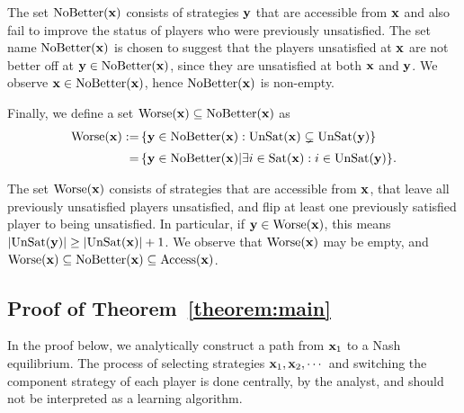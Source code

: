 The set ${\rm NoBetter}({\mathbf{x}})$ consists of strategies ${\mathbf{y}}$ that are accessible from ${\mathbf{x}}$ and also fail to improve the status of players who were previously unsatisfied. The set name ${\rm NoBetter}({\mathbf{x}})$ is chosen to suggest that the players unsatisfied at ${\mathbf{x}}$ are not better off at ${\mathbf{y}} \in {\rm NoBetter}({\mathbf{x}})$, since they are unsatisfied at both ${\mathbf{x}}$ and ${\mathbf{y}}$. We observe ${\mathbf{x}} \in {\rm NoBetter}({\mathbf{x}})$, hence ${\rm NoBetter}({\mathbf{x}})$ is non-empty. 

Finally, we define a set ${\rm Worse}({\mathbf{x}}) \subseteq {\rm NoBetter}({\mathbf{x}})$ as
\begin{align*}
{\rm Worse}({\mathbf{x}}) :=& \left\{ {\mathbf{y}} \in {\rm NoBetter}({\mathbf{x}}) : {\rm UnSat}({\mathbf{x}}) \subsetneq {\rm UnSat}({\mathbf{y}}) \right\}  \\[2.5pt]
            =&  \left\{ {\mathbf{y}} \in {\rm NoBetter}({\mathbf{x}}) \middle| \exists i \in {\rm Sat}({\mathbf{x}}) : i \in {\rm UnSat}({\mathbf{y}}) \right\} \hspace{-1.5pt}.            
\end{align*}

The set ${\rm Worse}({\mathbf{x}})$ consists of strategies that are accessible from ${\mathbf{x}}$, that leave all previously unsatisfied players unsatisfied, and flip at least one previously satisfied player to being unsatisfied. In particular, if ${\mathbf{y}} \in {\rm Worse}({\mathbf{x}})$, this means $| {\rm UnSat}( {\mathbf{y}}) | \geq  | {\rm UnSat}({\mathbf{x}}) | + 1$. We observe that ${\rm Worse}({\mathbf{x}})$ may be empty, and  ${\rm Worse}({\mathbf{x}}) \subseteq {\rm NoBetter}({\mathbf{x}}) \subseteq {\rm Access}({\mathbf{x}}) $. 




\subsection{Proof of Theorem~\ref{theorem:main}}

\begin{remark}  \label{remark:not-a-learning-algorithm}
    In the proof below, we analytically construct a path from ${\mathbf{x}}_1$ to a Nash equilibrium. The process of selecting strategies ${\mathbf{x}}_1, {\mathbf{x}}_2, \cdots$ and switching the component strategy of each player is done centrally, by the analyst, and should not be interpreted as a learning algorithm.  
\end{remark}

